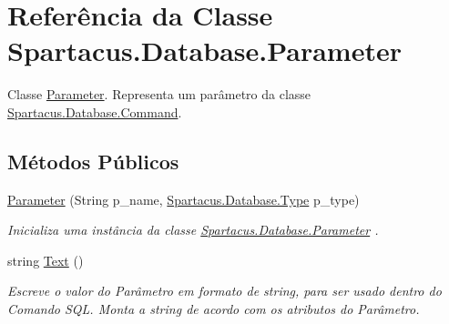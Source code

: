 \hypertarget{classSpartacus_1_1Database_1_1Parameter}{\section{Referência da Classe Spartacus.\+Database.\+Parameter}
\label{classSpartacus_1_1Database_1_1Parameter}
}


Classe \hyperlink{classSpartacus_1_1Database_1_1Parameter}{Parameter}. Representa um parâmetro da classe \hyperlink{classSpartacus_1_1Database_1_1Command}{Spartacus.\+Database.\+Command}.  


\subsection*{Métodos Públicos}
\begin{DoxyCompactItemize}
\item 
\hyperlink{classSpartacus_1_1Database_1_1Parameter_abb88975fcb3c617dfd1507876423d0f8}{Parameter} (String p\+\_\+name, \hyperlink{namespaceSpartacus_1_1Database_a9d4c2be7c9bc257b8d34c84b43e5ec32}{Spartacus.\+Database.\+Type} p\+\_\+type)
\begin{DoxyCompactList}\small\item\em Inicializa uma instância da classe \hyperlink{classSpartacus_1_1Database_1_1Parameter}{Spartacus.\+Database.\+Parameter} . \end{DoxyCompactList}\item 
string \hyperlink{classSpartacus_1_1Database_1_1Parameter_a2402087cb5b054351038a72541e0bdf8}{Text} ()
\begin{DoxyCompactList}\small\item\em Escreve o valor do Parâmetro em formato de string, para ser usado dentro do Comando S\+Q\+L. Monta a string de acordo com os atributos do Parâmetro. \end{DoxyCompactList}\end{DoxyCompactItemize}
